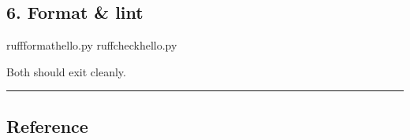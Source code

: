 \documentclass[a4paper,11pt,english]{sphinxmanual}
\begin{document}
\subsection{6. Format \& lint}
\label{\detokenize{getting_started/first_program:format-lint}}
\begin{sphinxVerbatim}[commandchars=\\\{\}]
ruffformathello.py
ruffcheckhello.py
\end{sphinxVerbatim}

\sphinxAtStartPar
Both should exit cleanly.


\bigskip\hrule\bigskip



\subsection{Reference}
\label{\detokenize{getting_started/first_program:reference}}
\end{document}
